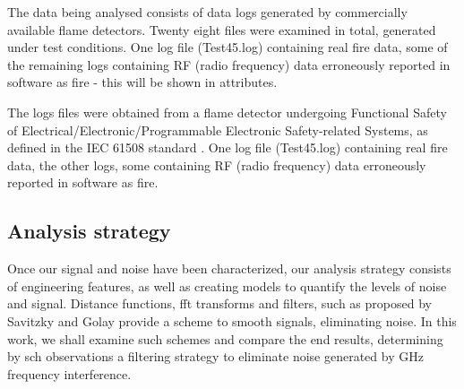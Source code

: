 The data being analysed consists of data logs generated by commercially available flame detectors. Twenty eight files were examined in total, generated under test conditions. One log file (Test45.log) containing real fire data, some of the remaining logs containing RF (radio frequency) data erroneously reported in software as fire - this will be shown in attributes.

The logs files were obtained from a flame detector undergoing Functional Safety of Electrical/Electronic/Programmable Electronic Safety-related Systems, as defined in the IEC 61508 standard \cite{wiki:IEC61508}. One log file (Test45.log) containing real fire data, the other logs, some containing RF (radio frequency) data erroneously reported in software as fire.

\subsection{Analysis strategy}

Once our signal and noise have been characterized, our analysis strategy consists of engineering features, as well as creating models to quantify the levels of noise and signal. Distance functions, fft transforms and filters, such as proposed by Savitzky and Golay \cite{Savitzky:1964} provide a scheme to smooth signals, eliminating noise. In this work, we shall examine such schemes and compare the end results, determining by sch observations a filtering strategy to eliminate noise generated by GHz frequency interference.
